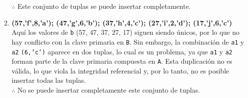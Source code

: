 \begin{enumerate}
    $\therefore$ Este conjunto de tuplas se puede insertar completamente. \\

    \item \textbf{(57,’f’,8,’a’); (47,’g’,6,’b’); (37,’h’,4,’c’); (27,’i’,2,’d’); (17,’j’,6,’c’)} \\
    
    Aquí los valores de \texttt{b} (57, 47, 37, 27, 17) siguen siendo únicos, por lo que no hay conflicto con la clave primaria en \texttt{B}. Sin embargo, la combinación de \texttt{a1} y \texttt{a2} \texttt{(6,'c')} aparece en dos tuplas, lo cual es un problema, ya que \texttt{a1} y \texttt{a2} forman parte de la clave primaria compuesta en \texttt{A}. Esta duplicación no es válida, lo que viola la integridad referencial y, por lo tanto, no es posible insertar todas las tuplas. \\

    $\therefore$ No se puede insertar completamente este conjunto de tuplas.
\end{enumerate}
